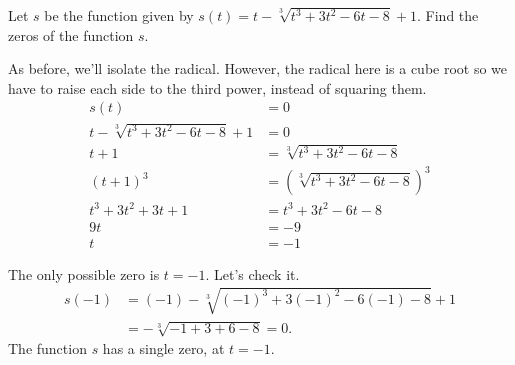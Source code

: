 \documentclass[nooutcomes]{ximera}
\begin{document}
	\begin{example}
		Let $s$ be the function given by $s(t) = t - \sqrt[3]{t^3+3t^2-6t-8}+1$. Find the zeros of the function $s$.
	
		\begin{explanation} 
			
			As before, we'll isolate the radical. However, the radical here is a cube root so we have to raise each side to the third power, instead of squaring them.
			\begin{align*}
				s(t) & =  0 \\
				t - \sqrt[3]{t^3+3t^2-6t-8}+1 & =  0 \\
				t +1 & =  \sqrt[3]{t^3+3t^2-6t-8} \\
				(t +1)^3 & =  \left(\sqrt[3]{t^3+3t^2-6t-8}\right)^3 \\
				t^3 + 3t^2 + 3t + 1 &= t^3+3t^2-6t-8\\
				9t &= -9\\
				t &= -1
			\end{align*}			

			The only possible zero is $t=-1$. Let's check it.
			\begin{align*}
				s(-1) & = (-1) - \sqrt[3]{(-1)^3+3(-1)^2-6(-1)-8}+1 \\
					&= - \sqrt[3]{-1+3+6-8} = 0.
			\end{align*}
			The function $s$ has a single zero, at $t=-1$.
		\end{explanation}
	\end{example}
\end{document}
